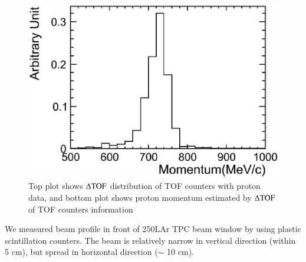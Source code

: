 \begin{figure}[htbp]
  \begin{center}
    \includegraphics[width=1.0\hsize,clip]{fig/Momentum_proton.eps}
    \caption{Top plot shows $\rm {\Delta TOF}$ distribution of TOF counters with proton data,
      and bottom plot shows proton momentum estimated by $\rm {\Delta TOF}$ of TOF counters information}
    \label{fig:Proton_momentum}
  \end{center}
\end{figure} 

We measured beam profile in front of 250LAr TPC beam window by using plastic scintillation counters.
The beam is relatively narrow in vertical direction (within 5 cm),
but spread in horizontal direction ($\sim$ 10 cm).



